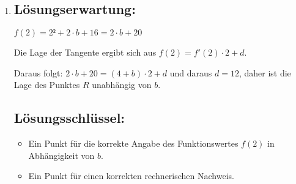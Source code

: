 \begin{langesbeispiel}
{\begin{enumerate}
\begin{itemize}
		$f(x)=0 \Rightarrow x_{1,2}=-\frac{b}{2}\pm\sqrt{\left(-\frac{b}{2}\right)²-16}$
		
		$\Rightarrow\left(-\frac{b}{2}\right)²-16=0 \Rightarrow b_1=-8, \hspace{0,5cm}b_2=8$
		
		$\Rightarrow x_1=4, \hspace{0,5cm} x_2=-4 \Rightarrow T_1=(4|0), T_2=(-4|0)$
		\item Tiefpunkt des Graphen von $f$ liegt auf der senkrechten Achse
		
		$\Rightarrow b=0 \Rightarrow T_3=(0|16)$\leer
		
		$g(x)=a\cdot x²+c$
		
		$g(0)=16 \hspace{1cm} c=16$
		
		$g(4)=0 \Rightarrow 16\cdot a+16=0 \Rightarrow a=-1 \Rightarrow g(x)=-x²+16$
	\end{itemize}

	\subsection{Lösungsschlüssel:}
	
\begin{itemize}
	\item Ein Punkt für die Angabe aller drei Tiefpunkte
	\item Ein Punkt für die Angabe einer korrekten Funktionsgleichung der Funktion $g$. Äquvalente Funktionsgleichungen sind ebenfalls als richtig zu werten.
\end{itemize}

\item \subsection{Lösungserwartung:}

	$f(2)=2²+2\cdot b+16=2\cdot b+20$
	
	Die Lage der Tangente ergibt sich aus $f(2)=f'(2)\cdot 2+d$.
	
	Daraus folgt: $2\cdot b+20=(4+b)\cdot 2+d$ und daraus $d=12$, daher ist die Lage des Punktes $R$ unabhängig von $b$.

	\subsection{Lösungsschlüssel:}
	
\begin{itemize}
	\item  Ein Punkt für die korrekte Angabe des Funktionswertes $f(2)$ in Abhängigkeit von $b$.
	\item Ein Punkt für einen korrekten rechnerischen Nachweis.
\end{itemize}
\end{enumerate}}
		\end{langesbeispiel}